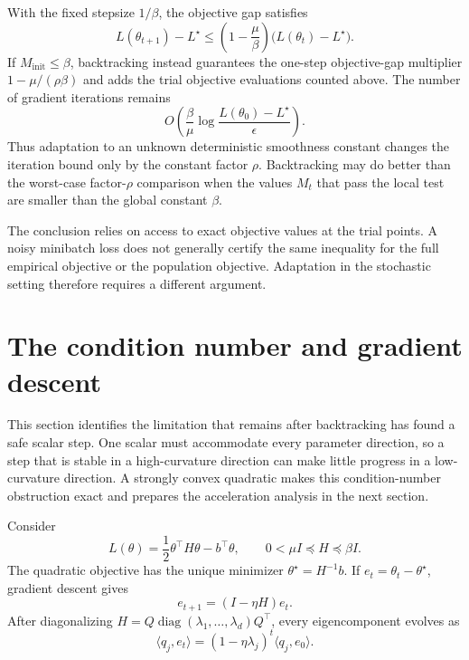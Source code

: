 \documentclass[11pt,twoside]{article}
\newcommand{\diag}{\operatorname{diag}}
\theoremstyle{definition}
\theoremstyle{remark}
\begin{document}
With the fixed stepsize $1/\beta$, the objective gap satisfies
\[
 L(\theta_{t+1})-L^\star
 \le\left(1-\frac\mu\beta\right)
       \bigl(L(\theta_t)-L^\star\bigr).
\]
If $M_{\mathrm{init}}\le\beta$, backtracking instead guarantees the one-step
objective-gap multiplier $1-\mu/(\rho\beta)$ and adds the trial objective
evaluations counted above.
The number of gradient iterations remains
\[
 O\left(\frac\beta\mu
 \log\frac{L(\theta_0)-L^\star}{\epsilon}\right).
\]
Thus adaptation to an unknown deterministic smoothness constant changes the
iteration bound only by the constant factor $\rho$. Backtracking may do
better than the worst-case factor-$\rho$ comparison when the values $M_t$
that pass the local test are smaller than the global constant $\beta$.

The conclusion relies on access to exact objective values at the trial
points. A noisy minibatch loss does not generally certify the same inequality
for the full empirical objective or the population objective. Adaptation in
the stochastic setting therefore requires a different argument.

\section{The condition number and gradient descent}
\label{sec:conditioning}

This section identifies the limitation that remains after backtracking has
found a safe scalar step. One scalar must accommodate every parameter
direction, so a step that is stable in a high-curvature direction can make
little progress in a low-curvature direction. A strongly convex quadratic
makes this condition-number obstruction exact and prepares the acceleration
analysis in the next section.

Consider
\begin{equation}
 L(\theta)=\frac12\theta^\top H\theta-b^\top\theta,
 \qquad
 0<\mu I\preceq H\preceq\beta I.
 \label{eq:quadratic-objective}
\end{equation}
The quadratic objective has the unique minimizer
$\theta^\star=H^{-1}b$. If
$e_t=\theta_t-\theta^\star$, gradient descent gives
\begin{equation}
 e_{t+1}=(I-\eta H)e_t.
 \label{eq:quadratic-error-recursion}
\end{equation}
After diagonalizing $H=Q\diag(\lambda_1,\ldots,\lambda_d)Q^\top$, every
eigencomponent evolves as
\begin{equation}
 \langle q_j,e_t\rangle
 =(1-\eta\lambda_j)^t\langle q_j,e_0\rangle.
 \label{eq:eigencomponent-gd}
\end{equation}
\end{document}
